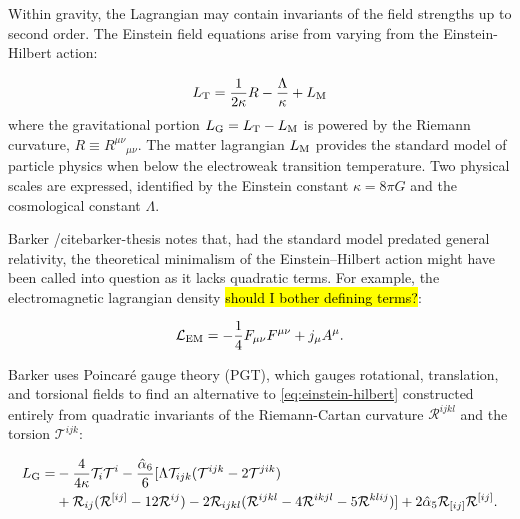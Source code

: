 \documentclass{article}
\begin{document}
Within gravity, the Lagrangian may contain invariants of the field strengths up to second order. The Einstein field equations arise from varying from the Einstein-Hilbert action:

\begin{equation}
  \label{eq:einstein-hilbert}
  L_\textrm T = \frac{1}{2\kappa}R - \frac{\Lambda}{\kappa} + L_\textrm M
\end{equation}
%
where the gravitational portion $L_\textrm G = L_\textrm T - L_\textrm M$ is powered by the Riemann curvature, $R \equiv {R^{\mu\nu}}_{\mu\nu}$. The matter lagrangian $L_\textrm M$ provides the standard model of particle physics when below the electroweak transition temperature. Two physical scales are expressed, identified by the Einstein constant $\kappa=8\pi G$ and the cosmological constant $\Lambda$. 


Barker /cite{barker-thesis} notes that, had the standard model predated general relativity, the theoretical minimalism of the Einstein--Hilbert action might have been called into question as it lacks quadratic terms. For example, the electromagnetic lagrangian density \hl{should I bother defining terms?}:

\begin{equation}
  \mathcal L_\textrm{EM} = -\frac{1}{4} F_{\mu\nu}F^{\mu\nu} + j_\mu A^\mu \textrm .
\end{equation}

Barker uses Poincar\'e gauge theory (PGT), which gauges rotational, translation, and torsional fields to find an alternative to \ref{eq:einstein-hilbert} constructed entirely from quadratic invariants of the Riemann-Cartan curvature $\mathcal R^{ijkl}$ and the torsion $\mathcal T^{ijk}$:

\begin{equation}\begin{aligned}
  \label{eq:lagrangian}
  L_\textrm G = & -\frac{4}{4\kappa}\mathcal T_i\mathcal T^i - \frac{\hat{\alpha}_6}{6} [\Lambda\mathcal T_{ijk}(\mathcal T^{ijk}-2\mathcal T^{jik}) \\ & + \mathcal R_{ij}(\mathcal R ^{[ij]}-12\mathcal R^{ij}) - 2\mathcal R_{ijkl}(\mathcal R ^{ijkl}-4\mathcal R^{ikjl}-5\mathcal R^{klij})] + 2\hat{\alpha}_5\mathcal R_{[ij]}\mathcal R^{[ij]} \textrm{.}
\end{aligned}\end{equation}
\end{document}
